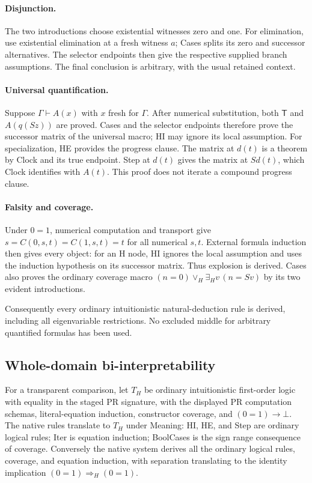 \documentclass[11pt,letterpaper]{article}
\theoremstyle{definition}\newtheorem{definition}[theorem]{Definition}
\theoremstyle{remark}\newtheorem{remark}[theorem]{Remark}
\begin{document}
\paragraph{Disjunction.}
The two introductions choose existential witnesses zero and one.
For elimination, use existential elimination at a fresh witness $a$;
Cases splits its zero and successor alternatives.  The selector endpoints
then give the respective supplied branch assumptions.  The final
conclusion is arbitrary, with the usual retained context.

\paragraph{Universal quantification.}
Suppose $\Gamma\vdash A(x)$ with $x$ fresh for $\Gamma$.
After numerical substitution, both $\mathsf T$ and $A(q(Sz))$ are
proved.  Cases and the selector endpoints therefore prove the successor
matrix of the universal macro; HI may ignore its local assumption.
For specialization, HE provides the progress clause.  The matrix at
$d(t)$ is a theorem by Clock and its true endpoint.  Step at $d(t)$
gives the matrix at $Sd(t)$, which Clock identifies with $A(t)$.
This proof does not iterate a compound progress clause.

\paragraph{Falsity and coverage.}
Under $0=1$, numerical computation and transport give
$s=C(0,s,t)=C(1,s,t)=t$ for all numerical $s,t$.
External formula induction then gives every object: for an H node,
HI ignores the local assumption and uses the induction hypothesis on
its successor matrix.  Thus explosion is derived.  Cases also proves
the ordinary coverage macro
$(n=0)\vee_H\exists_H v\,(n=Sv)$ by its two evident introductions.

Consequently every ordinary intuitionistic natural-deduction rule is
derived, including all eigenvariable restrictions.  No excluded middle
for arbitrary quantified formulas has been used.

\subsection{Whole-domain bi-interpretability}

For a transparent comparison, let $T_H$ be ordinary intuitionistic
first-order logic with equality in the staged PR signature, with the
displayed PR computation schemas, literal-equation induction,
constructor coverage, and $(0=1)\to\bot$.  The native rules translate
to $T_H$ under Meaning: HI, HE, and Step are ordinary logical rules;
Iter is equation induction; BoolCases is the sign range consequence
of coverage.  Conversely the native
system derives all the ordinary logical rules, coverage, and equation
induction, with separation translating to the identity implication
$(0=1)\Rightarrow_H(0=1)$.
\end{document}
